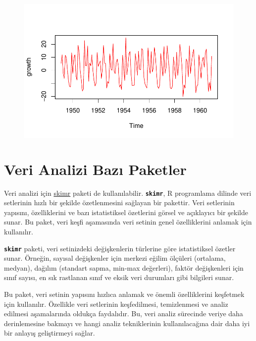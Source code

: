 \documentclass[
  letterpaper,
  DIV=11,
  numbers=noendperiod]{scrreprt}
\begin{document}
\begin{figure}[H]

{\centering \includegraphics{data_analysis_files/figure-pdf/unnamed-chunk-5-8.pdf}

}

\end{figure}

\hypertarget{veri-analizi-bazux131-paketler}{%
\section*{Veri Analizi Bazı
Paketler}\label{veri-analizi-bazux131-paketler}}


Veri analizi için
\href{https://cran.r-project.org/web/packages/skimr/vignettes/skimr.html}{skimr}
paketi de kullanılabilir. \textbf{\texttt{skimr}}, R programlama dilinde
veri setlerinin hızlı bir şekilde özetlenmesini sağlayan bir pakettir.
Veri setlerinin yapısını, özelliklerini ve bazı istatistiksel özetlerini
görsel ve açıklayıcı bir şekilde sunar. Bu paket, veri keşfi aşamasında
veri setinin genel özelliklerini anlamak için kullanılır.

\textbf{\texttt{skimr}} paketi, veri setinizdeki değişkenlerin türlerine
göre istatistiksel özetler sunar. Örneğin, sayısal değişkenler için
merkezi eğilim ölçüleri (ortalama, medyan), dağılım (standart sapma,
min-max değerleri), faktör değişkenleri için sınıf sayısı, en sık
rastlanan sınıf ve eksik veri durumları gibi bilgileri sunar.

Bu paket, veri setinin yapısını hızlıca anlamak ve önemli özelliklerini
keşfetmek için kullanılır. Özellikle veri setlerinin keşfedilmesi,
temizlenmesi ve analiz edilmesi aşamalarında oldukça faydalıdır. Bu,
veri analiz sürecinde veriye daha derinlemesine bakmayı ve hangi analiz
tekniklerinin kullanılacağına dair daha iyi bir anlayış geliştirmeyi
sağlar.
\end{document}
